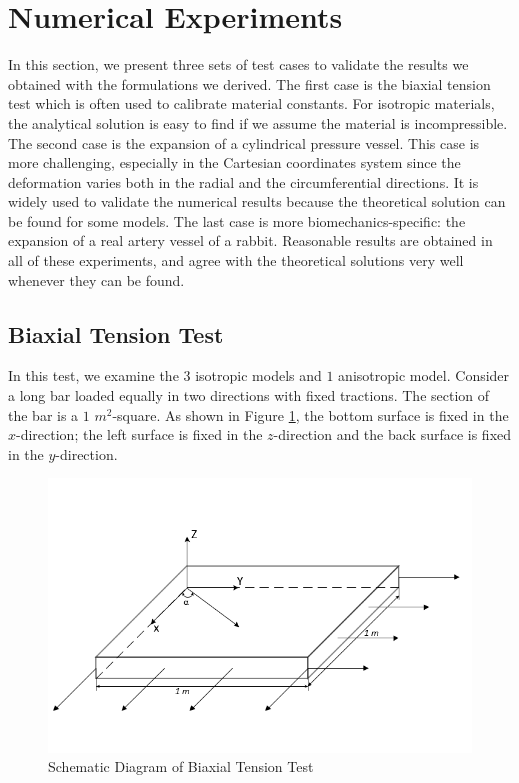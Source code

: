 \section{Numerical Experiments}
In this section, we present three sets of test cases to validate the results we obtained with the formulations we derived. The first case is the biaxial tension test which is often used to calibrate material constants. For isotropic materials, the analytical solution is easy to find if we assume the material is incompressible. The second case is the expansion of a cylindrical pressure vessel. This case is more challenging, especially in the Cartesian coordinates system since the deformation varies both in the radial and the circumferential directions. It is widely used to validate the numerical results because the theoretical solution can be found for some models. The last case is more biomechanics-specific: the expansion of a real artery vessel of a rabbit. Reasonable results are obtained in all of these experiments, and agree with the theoretical solutions very well whenever they can be found.

\subsection{Biaxial Tension Test}
\label{biaxial_tension_test}
In this test, we examine the $3$ isotropic models and $1$ anisotropic model. Consider a long bar loaded equally in two directions with fixed tractions. The section of the bar is a $1$ $m^2$-square. As shown in Figure \ref{fig:biaxial_schematic}, the bottom surface is fixed in the $x$-direction; the left surface is fixed in the $z$-direction and the back surface is fixed in the $y$-direction. 

\begin{figure}[H]
\centering
\includegraphics[width=.6\textwidth]{./figures/biaxial_schematic.png}
\caption{Schematic Diagram of Biaxial Tension Test}
\label{fig:biaxial_schematic}
\end{figure}

